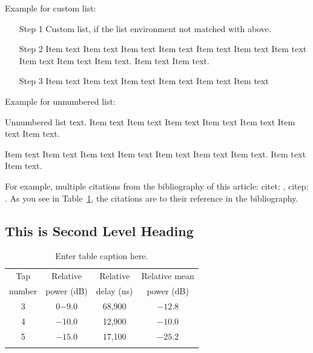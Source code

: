 Example for custom list:
\begin{enumerate}[Step 1]
\item[Step 1] Custom list, if the list environment not matched with above.
\item[Step 2] Item  text  Item text  Item text  Item text  Item text Item text  
Item text  Item text Item text Item text. Item text Item text.
\item[Step 3] Item  text  Item text  Item text  Item text  Item text  Item text 
\end{enumerate}

Example for unnumbered list:
\begin{description}
\item Unnumbered list text. Item text  Item text  Item text  Item text  Item 
text Item text  Item text.
\item Item text  Item text  Item text  Item text  Item text  Item text  Item 
text. Item text  Item text.
\end{description}

For example, multiple citations from the bibliography of this article:
citet: \citet{CR1,CR3}, citep: \citep{CR4,CR5}. As you see in Table~\ref{tab2-1}, the citations are to their reference in the bibliography.

\subsection{This is Second Level Heading}
\lipsum[3-4]

\begin{table}
\caption{Enter table caption here.\label{tab2-1}}{%
\begin{tabular}{@{}cccc@{}}
\toprule
Tap     &Relative   &Relative   &Relative mean\\
number  &power (dB) &delay (ns) &power (dB)\\
\midrule
3 &0$-9.0$  &68,900\footnotemark[1] &$-12.8$\\
4 &$-10.0$ &12,900\footnotemark[2] &$-10.0$\\
5 &$-15.0$ &17,100 &$-25.2$\\
\botrule
\end{tabular}}{
}
\end{table}

